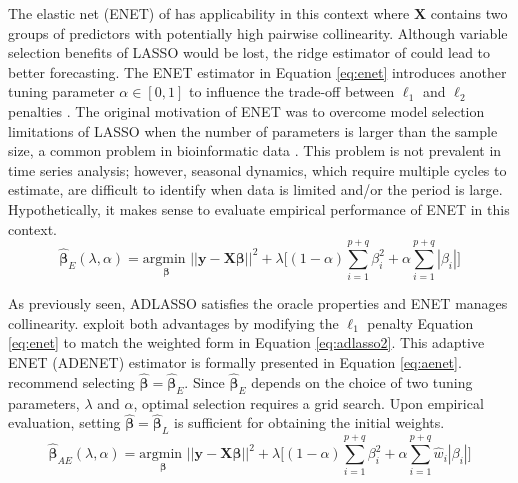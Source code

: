 The elastic net (ENET) of \cite{Zou2005} has applicability in this context where $\bm{X}$ contains two groups of predictors with potentially high pairwise collinearity. Although variable selection benefits of LASSO would be lost, the ridge estimator of \cite{Hoerl1970} could lead to better forecasting. The ENET estimator in Equation \ref{eq:enet}  introduces another tuning parameter $\alpha\in[0,1]$ to influence the trade-off between $\ell_1$ and $\ell_2$ penalties \citep{DeMol2009}. The original motivation of ENET was to overcome model selection limitations of LASSO when the number of parameters is larger than the sample size, a common problem in bioinformatic data \citep{Zou2005}. This problem is not prevalent in time series analysis; however, seasonal dynamics, which require multiple cycles to estimate, are difficult to identify when data is limited and/or the period is large. Hypothetically, it makes sense to evaluate empirical performance of ENET in this context.
\begin{equation}
\label{eq:enet}
\hat{\bm{\beta}}_{E} (\lambda,\alpha)= \underset{\bm{\beta}}{\textrm{argmin }}  ||\bm{y}-\bm{X}\bm{\beta}||^2 + \lambda\bigg[ (1-\alpha) \sum\limits_{i=1}^{p+q} \beta^2_i+ \alpha\sum\limits_{i=1}^{p+q} |\beta_i| \bigg]
\end{equation}

As previously seen, ADLASSO satisfies the oracle properties \citep{Zou2006} and ENET \citep{Zou2005} manages collinearity. \cite{Zou2009a} exploit both advantages by modifying the $\ell_1$ penalty Equation \ref{eq:enet} to match the weighted form in Equation \ref{eq:adlasso2}. This adaptive ENET (ADENET) estimator is formally presented in Equation \ref{eq:aenet}. \cite{Zou2009a} recommend selecting $\hat{\bm{\beta}}=\hat{\bm{\beta}}_{E}$. Since $\hat{\bm{\beta}}_{E}$ depends on the choice of two tuning parameters, $\lambda$ and $\alpha$, optimal selection requires a grid search. Upon empirical evaluation, setting $\hat{\bm{\beta}}=\hat{\bm{\beta}}_{L}$ is sufficient for obtaining the initial weights.
\begin{equation}
\label{eq:aenet}
\hat{\bm{\beta}}_{AE} (\lambda,\alpha)= \underset{\bm{\beta}}{\textrm{argmin }}  ||\bm{y}-\bm{X}\bm{\beta}||^2 + \lambda\bigg[ (1-\alpha)  \sum\limits_{i=1}^{p+q} \beta^2_i+ \alpha\sum\limits_{i=1}^{p+q} \hat{w}_{i}|\beta_i| \bigg]
\end{equation}


